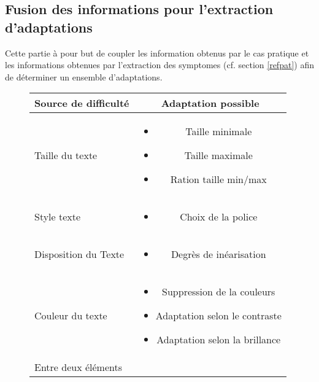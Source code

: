 \documentclass[french,a4paper]{report}
\begin{document}
{\subsection{Fusion des informations pour l'extraction d'adaptations}
Cette partie à pour but de coupler les information obtenus par le cas
pratique et les informations obtenues par l'extraction des
\glspl{symptome} (cf. section \ref{refpat}) afin de
déterminer un ensemble d'adaptations.\\
\begin{figure}[H]
\begin{center}
\begin{tabular}{| l | c |}
\hline
Source de difficulté & Adaptation possible \rule[-7pt]{0pt}{20pt} \\
\hline
Taille du texte & \begin{minipage}{8cm}\medskip
\begin{itemize}\item Taille minimale
\item Taille maximale
\item Ration taille min/max
\medskip\end{itemize}\end{minipage}\\
\hline
Style texte & \begin{minipage}{8cm}\medskip
\begin{itemize}\item Choix de la police
\medskip\end{itemize}\end{minipage}\\
\hline
Disposition du Texte & \begin{minipage}{8cm}\medskip
\begin{itemize}\item Degrès de inéarisation
\medskip\end{itemize}\end{minipage}\\
\hline
Couleur du texte & \begin{minipage}{8cm}\medskip
\begin{itemize}\item Suppression de la couleurs
\item Adaptation selon le contraste
\item Adaptation selon la brillance
\medskip\end{itemize}\end{minipage}\\
\hline
Entre deux éléments & \begin{minipage}{8cm}\medskip

\end{minipage}
\end{tabular}
\end{center}
\end{figure}}
\end{document}
